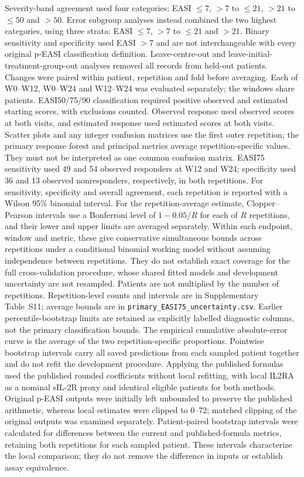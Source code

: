 Severity-band agreement used four categories: EASI $\leq7$, $>7$ to $\leq21$, $>21$ to $\leq50$ and $>50$. Error subgroup analyses instead combined the two highest categories, using three strata: EASI $\leq7$, $>7$ to $\leq21$ and $>21$. Binary sensitivity and specificity used EASI $>7$ and are not interchangeable with every original p-EASI classification definition. Leave-centre-out and leave-initial-treatment-group-out analyses removed all records from held-out patients. Changes were paired within patient, repetition and fold before averaging. Each of W0--W12, W0--W24 and W12--W24 was evaluated separately; the windows share patients. EASI50/75/90 classification required positive observed and estimated starting scores, with exclusions counted. Observed response used observed scores at both visits, and estimated response used estimated scores at both visits. Scatter plots and any integer confusion matrices use the first outer repetition; the primary response forest and principal metrics average repetition-specific values. They must not be interpreted as one common confusion matrix. EASI75 sensitivity used 49 and 54 observed responders at W12 and W24; specificity used 36 and 13 observed nonresponders, respectively, in both repetitions. For sensitivity, specificity and overall agreement, each repetition is reported with a Wilson 95\% binomial interval. For the repetition-average estimate, Clopper--Pearson intervals use a Bonferroni level of $1-0.05/R$ for each of $R$ repetitions, and their lower and upper limits are averaged separately. Within each endpoint, window and metric, these give conservative simultaneous bounds across repetitions under a conditional binomial working model without assuming independence between repetitions. They do not establish exact coverage for the full cross-validation procedure, whose shared fitted models and development uncertainty are not resampled. Patients are not multiplied by the number of repetitions. Repetition-level counts and intervals are in Supplementary Table~S11; average bounds are in \texttt{primary\_EASI75\_uncertainty.csv}. Earlier percentile-bootstrap limits are retained as explicitly labelled diagnostic columns, not the primary classification bounds. The empirical cumulative absolute-error curve is the average of the two repetition-specific proportions. Pointwise bootstrap intervals carry all saved predictions from each sampled patient together and do not refit the development procedure. Applying the published formulas used the published rounded coefficients without local refitting, with local IL2RA as a nominal sIL-2R proxy and identical eligible patients for both methods. Original p-EASI outputs were initially left unbounded to preserve the published arithmetic, whereas local estimates were clipped to 0--72; matched clipping of the original outputs was examined separately. Patient-paired bootstrap intervals were calculated for differences between the current and published-formula metrics, retaining both repetitions for each sampled patient. These intervals characterize the local comparison; they do not remove the difference in inputs or establish assay equivalence.\citep{thijs2017,thijs2019,bakker2020}


